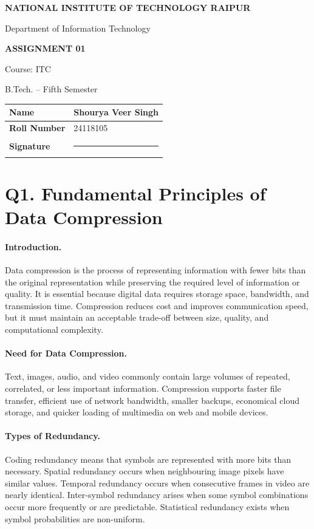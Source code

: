 \documentclass[12pt,a4paper]{article}
\newcommand{\RollNumber}{24118105}
\newcommand{\StudentName}{Shourya Veer Singh}
\renewcommand{\arraystretch}{1.2}
\newcommand{\qheading}[1]{\section*{#1}}
\newcommand{\topic}[1]{\paragraph{\color{navy}#1.}}
\begin{document}
\begin{titlepage}
\thispagestyle{fancy}
\vspace*{1.2cm}
\begin{center}
{\Large\bfseries NATIONAL INSTITUTE OF TECHNOLOGY RAIPUR\par}
\vspace{0.35cm}
{\large Department of Information Technology\par}
\vspace{1.1cm}
{\LARGE\bfseries ASSIGNMENT 01\par}
\vspace{0.45cm}
{\large Course: ITC\par}
{\large B.Tech. -- Fifth Semester\par}
\vfill
\end{center}
\begin{center}
\renewcommand{\arraystretch}{1.6}
\begin{tabular}{|>{\bfseries}p{4cm}|p{8cm}|}
\hline
Name & \StudentName\\ \hline
Roll Number & \RollNumber\\ \hline
Signature & \rule{5cm}{0.4pt}\\ \hline
\end{tabular}
\end{center}
\vfill
\end{titlepage}

\qheading{Q1. Fundamental Principles of Data Compression}

\topic{Introduction}
Data compression is the process of representing information with fewer bits than the original representation while preserving the required level of information or quality. It is essential because digital data requires storage space, bandwidth, and transmission time. Compression reduces cost and improves communication speed, but it must maintain an acceptable trade-off between size, quality, and computational complexity.

\topic{Need for Data Compression}
Text, images, audio, and video commonly contain large volumes of repeated, correlated, or less important information. Compression supports faster file transfer, efficient use of network bandwidth, smaller backups, economical cloud storage, and quicker loading of multimedia on web and mobile devices.

\topic{Types of Redundancy}
Coding redundancy means that symbols are represented with more bits than necessary. Spatial redundancy occurs when neighbouring image pixels have similar values. Temporal redundancy occurs when consecutive frames in video are nearly identical. Inter-symbol redundancy arises when some symbol combinations occur more frequently or are predictable. Statistical redundancy exists when symbol probabilities are non-uniform.
\end{document}
